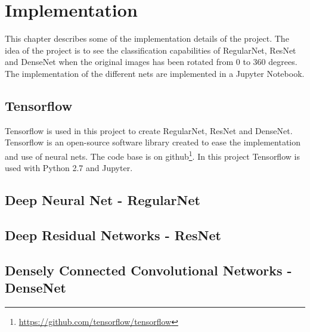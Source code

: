 \chapter{Implementation}
\label{chp:impl}

This chapter describes some of the implementation details of the project. The idea of the project is to see the classification capabilities of RegularNet, ResNet and DenseNet when the original images has been rotated from 0 to 360 degrees. The implementation of the different nets are implemented in a Jupyter Notebook.

\section{Tensorflow}
Tensorflow is used in this project to create RegularNet, ResNet and DenseNet. 
Tensorflow is an open-source software library created to ease the implementation and use of neural nets. The code base is on github\footnote{\url{https://github.com/tensorflow/tensorflow}}.
In this project Tensorflow is used with Python 2.7 and Jupyter.



\section{Deep Neural Net - RegularNet}
\section{Deep Residual Networks - ResNet}
\section{Densely Connected Convolutional Networks - DenseNet}